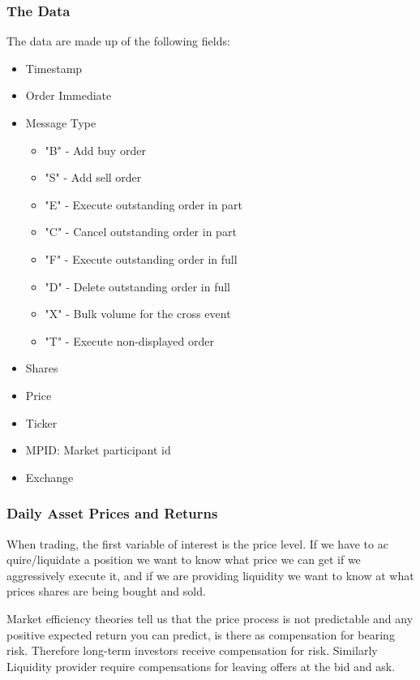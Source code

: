 \documentclass[11pt,a4paper]{article}
\theoremstyle{definition}
\theoremstyle{plain}
\theoremstyle{remark}
\newcommand{\1}{\mathbbm{1}}
\begin{document}
\subsubsection{The Data}
The data are made up of the following fields: 
\begin{itemize}
    \item Timestamp
    \item Order Immediate
    \item Message Type
    \begin{itemize}
        \item "B" - Add buy order 
        \item "S" - Add sell order 
        \item "E" - Execute outstanding order in part 
        \item "C" - Cancel outstanding order in part 
        \item "F" - Execute outstanding order in full 
        \item "D" - Delete outstanding order in full 
        \item "X" - Bulk volume for the cross event 
        \item "T" - Execute non-displayed order 
    \end{itemize}
    \item Shares 
    \item Price 
    \item Ticker 
    \item MPID: Market participant id
    \item Exchange
\end{itemize}

\subsubsection{Daily Asset Prices and Returns}
When trading, the first variable of interest is the price level. If we have to ac
quire/liquidate a position we want to know what price we can get if we aggressively execute it, and if we are providing liquidity we want to know at what 
prices shares are being bought and sold. 

Market efficiency theories tell us that 
the price process is not predictable and any positive expected return 
you can predict, is there as compensation for bearing risk. Therefore long-term investors receive 
compensation for risk. Similarly Liquidity provider require compensations for leaving offers at the bid and ask. 
\end{document}
